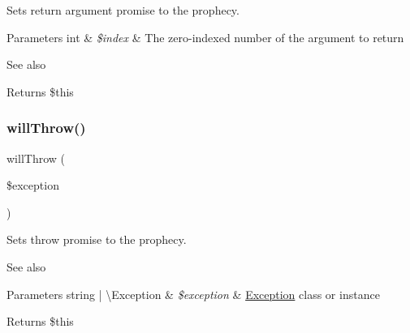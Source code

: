 Sets return argument promise to the prophecy.


\begin{DoxyParams}[1]{Parameters}
int & {\em \$index} & The zero-\/indexed number of the argument to return\\
\hline
\end{DoxyParams}
\begin{DoxySeeAlso}{See also}

\end{DoxySeeAlso}
\begin{DoxyReturn}{Returns}
\$this 
\end{DoxyReturn}
\mbox{\label{class_prophecy_1_1_prophecy_1_1_method_prophecy_af54a02bf8e64c69934bdd3dbf188be32}} 
\subsubsection{\texorpdfstring{will\+Throw()}{willThrow()}}
{\footnotesize\ttfamily will\+Throw (\begin{DoxyParamCaption}\item[{}]{\$exception }\end{DoxyParamCaption})}

Sets throw promise to the prophecy.

\begin{DoxySeeAlso}{See also}

\end{DoxySeeAlso}

\begin{DoxyParams}[1]{Parameters}
string | \textbackslash{}\+Exception & {\em \$exception} & \mbox{\hyperlink{namespace_prophecy_1_1_exception}{Exception}} class or instance\\
\hline
\end{DoxyParams}
\begin{DoxyReturn}{Returns}
\$this 
\end{DoxyReturn}
\mbox{\label{class_prophecy_1_1_prophecy_1_1_method_prophecy_a0e90c170a527e9527e3eb210d64e6bb3}} 
